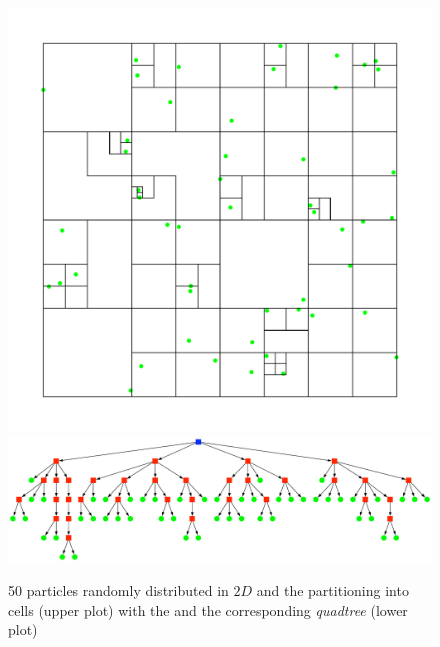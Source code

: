 \begin{figure}[htbp]
\begin{center}
\includegraphics[scale=0.6]{quadtree50_xy.pdf}
\includegraphics[scale=0.3]{quadtree50.pdf}
\caption{50 particles randomly distributed in $2D$ and the partitioning into cells (upper plot) with the and the corresponding \emph{quadtree} (lower plot)}
\label{fig:2D_BHtree}
\end{center}
\end{figure}



